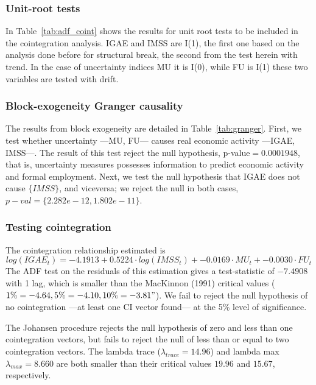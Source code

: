 \documentclass[12pt]{article}
\begin{document}
\subsubsection*{Unit-root tests}
In Table~\ref{tab:adf_coint} shows the results for unit root tests to be included in the cointegration analysis. IGAE and IMSS are I(1), the first one based on the analysis done before for structural break, the second from the test herein with trend. In the case of uncertainty indices MU it is I(0), while FU is I(1) these two variables are tested with drift.




\subsubsection*{Block-exogeneity Granger causality}

The results from block exogeneity are detailed in Table~\ref{tab:granger}. First, we test whether uncertainty ---MU, FU--- causes real economic activity ---IGAE, IMSS---. The result of this test reject the null hypothesis, p-value$=0.0001948$, that is, uncertainty measures possesses information to predict economic activity and formal employment. Next, we test the null hypothesis that IGAE does not cause $\{IMSS \}$, and viceversa; we reject the null in both cases, $p-val= \{2.282e-12, 1.802e-11\}$. 




\subsubsection*{Testing cointegration}

The cointegration relationship estimated is 
\[
  log(IGAE_t) = -4.1913 + 0.5224 \cdot log(IMSS_t) + -0.0169 \cdot MU_t + -0.0030 \cdot FU_t
\]
The ADF test on the residuals of this estimation gives a test-statistic of $-7.4908$ with 1 lag, which is smaller than the MacKinnon (1991) critical values ($ 1\% = -4.64,  5\% = -4.10,   10\% = -3.81"$). We fail to reject the null hypothesis of no cointegration ---at least one CI vector found--- at the 5\% level of significance. 

The Johansen procedure rejects the null hypothesis of zero and less than one cointegration vectors, but fails to reject the null of less than or equal to two cointegration vectors. The lambda trace ($\lambda_{trace}=14.96$) and lambda max $\lambda_{max}=8.660$ are both smaller than their critical values $19.96$ and $15.67$, respectively.
\end{document}
